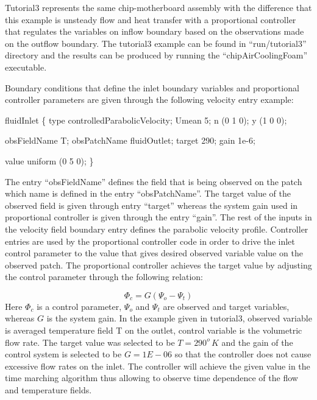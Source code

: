Tutorial3 represents the same chip-motherboard assembly with the
difference that this example is unsteady flow and heat transfer with a
proportional controller that regulates the variables on inflow
boundary based on the observations made on the outflow boundary. The
tutorial3 example can be found in ``run/tutorial3''
directory and the results can be produced by running the
``chipAirCoolingFoam'' executable. 

Boundary conditions that define the inlet boundary variables and
proportional controller parameters are given through the following
velocity entry example:

\begin{verbQuoteSmall}
    fluidInlet
    \{
        type            controlledParabolicVelocity;
        Umean           5;
        n               (0 1 0);
        y               (1 0 0);

        obsFieldName    T;
        obsPatchName    fluidOutlet;
        target          290;
        gain            1e-6;

        value           uniform (0 5 0);
    \}
\end{verbQuoteSmall}

The entry ``obsFieldName'' defines the field that is being observed on
the patch which name is defined in the entry ``obsPatchName''. The
target value of the observed field is given through entry ``target''
whereas the system gain used in proportional controller is given
through the entry ``gain''. The rest of the inputs in the velocity
field boundary entry defines the parabolic velocity
profile. Controller entries are used by the proportional controller
code in order to drive the inlet control parameter to the value that
gives desired observed variable value on the observed patch. The
proportional controller achieves the target value by adjusting the
control parameter through the following relation:

\begin{equation}
  \Phi_c = G(\Psi_o - \Psi_t)
\end{equation}
Here $\Phi_c$ is a control parameter, $\Psi_o$ and $\Psi_t$ are
observed and target variables, whereas $G$ is the system gain. In the
example given in tutorial3, observed variable is averaged temperature
field T on the outlet, control variable is the volumetric flow
rate. The target value was selected to be $T= 290^o\,K$ and the gain
of the control system is selected to be $G=1E-06$ so that the
controller does not cause excessive flow rates on the inlet. The
controller will achieve the given value in the time marching algorithm
thus allowing to observe time dependence of the flow and temperature
fields.

